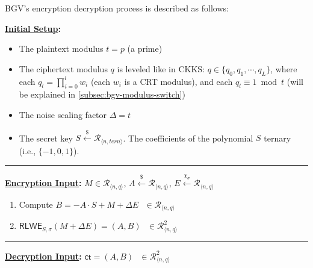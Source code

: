 BGV's encryption decryption process is described as follows:


\begin{tcolorbox}[title={\textbf{\tboxlabel{\ref*{subsec:bgv-enc-dec}} BGV Encryption and Decryption}}]

\textbf{\underline{Initial Setup}:}

\begin{itemize}
\item The plaintext modulus $t = p$ (a prime)

\item The ciphertext modulus $q$ is leveled like in CKKS: $q \in \{q_0, q_1, \cdots, q_L\}$, where each $q_l = \prod\limits_{i=0}^l w_i$ (each $w_i$ is a CRT modulus), and each $q_l \equiv 1 \bmod t$ (will be explained in \autoref{subsec:bgv-modulus-switch})

\item The noise scaling factor $\Delta=t$
\item The secret key $S \xleftarrow{\$} \mathcal{R}_{\langle n, \textit{tern} \rangle}$. The coefficients of the polynomial $S$ ternary (i.e., $\{-1, 0, 1\}$).

\end{itemize}

\par\noindent\rule{\textwidth}{0.4pt}

\textbf{\underline{Encryption Input}:} $M \in \mathcal{R}_{\langle n, q \rangle}$, $A \xleftarrow{\$} \mathcal{R}_{\langle n, q \rangle}$, $E \xleftarrow{\chi_\sigma} \mathcal{R}_{\langle n, q \rangle}$


\begin{enumerate}

\item Compute $B = -A \cdot S + M + \Delta E \text{ } \in \mathcal{R}_{\langle n,q \rangle}$

\item $\textsf{RLWE}_{S,\sigma}(M + \Delta E) = (A, B) \text{ } \in \mathcal{R}_{\langle n,q \rangle}^2$

\end{enumerate}

\par\noindent\rule{\textwidth}{0.4pt}

\textbf{\underline{Decryption Input}:} $\textsf{ct} = (A, B) \text{ } \in \mathcal{R}_{\langle n,q \rangle}^2$


\end{tcolorbox}
